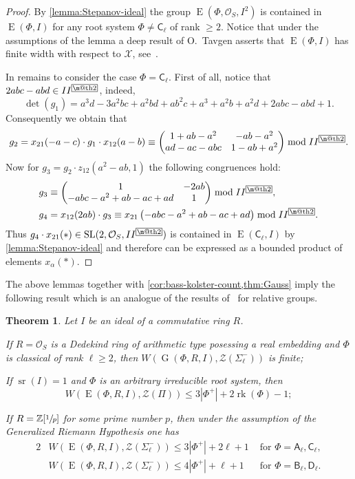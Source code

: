 \documentclass[11pt]{amsart}
\makeatletter
\theoremstyle{plain}
\newtheorem{thm}{Theorem}
\numberwithin{equation}{section}
\numberwithin{lemma}{section}
\theoremstyle{definition}
\theoremstyle{remark}
\DeclareMathOperator{\G}{G}
\DeclareMathOperator{\SL}{SL}
\DeclareMathOperator{\E}{E}
\DeclareMathOperator{\sr}{sr}
\DeclareMathOperator{\rk}{rk}
\newcommand{\rA}{\mathsf{A}}
\newcommand{\rB}{\mathsf{B}}
\newcommand{\rC}{\mathsf{C}}
\newcommand{\rD}{\mathsf{D}}
\newcommand{\indexbox}[1]{\text{\fboxsep=.1em\fbox{\m@th$\displaystyle#1$}}}
\makeatother
\begin{document}
\begin{proof}
By \cref{lemma:Stepanov-ideal} the group $\E\left(\Phi, \mathcal{O}_S, I^2\right)$ is contained in $\E(\Phi, I)$ for any root system $\Phi\neq\rC_\ell$ of rank $\geqslant2$.
Notice that under the assumptions of the lemma a deep result of O.~Tavgen asserts that $\E(\Phi, I)$ has finite width with respect to $\mathcal{X}$, see~\cite[Theorem~3.3]{TavgenThesis}.

In remains to consider the case $\Phi=\rC_\ell$. First of all, notice that $2abc-abd\in II^{\indexbox{2}}$, indeed,
\[ \det(g_1)=a^3d-3a^2bc+a^2bd+ab^2c+a^3+a^2b+a^2d+2abc-abd+1. \]
Consequently we obtain that
\[ g_2=x_{21}(-a-c)\cdot g_1\cdot x_{12}(a-b)\equiv
\begin{pmatrix}
1+ab-a^2 & -ab-a^2 \\ ad-ac-abc & 1-ab+a^2
\end{pmatrix}\bmod II^{\indexbox{2}}. \]
Now for $g_3=g_2\cdot z_{12}\left(a^2-ab, 1\right)$ the following congruences hold:
\begin{align*}
& g_3\equiv\begin{pmatrix} 1 & -2ab \\ -abc-a^2+ab-ac+ad & 1 \end{pmatrix}\bmod II^{\indexbox{2}}, \\
& g_4=x_{12}(2ab)\cdot g_3\equiv x_{21}\left(-abc-a^2+ab-ac+ad\right)\bmod II^{\indexbox{2}}.
\end{align*}
Thus $g_4\cdot x_{21}(*)\in\SL(2, \mathcal{O}_S, II^{\indexbox{2}})$ is contained in $\E(\rC_\ell, I)$ by \cref{lemma:Stepanov-ideal} and therefore
can be expressed as a bounded product of elements $x_\alpha(*)$.
\end{proof}
The above lemmas together with \cref{cor:bass-kolster-count,thm:Gauss} imply the following result
 which is an analogue of the results of~\cite{VseUnitrZ1p, VavSmSuUnitrEng, Tavgen91} for relative groups.
\begin{thm}\label{thm:width} Let $I$ be an ideal of a commutative ring $R$.
\begin{thmlist}
\item If $R=\mathcal{O}_S$ is a Dedekind ring of arithmetic type posessing a real embedding and $\Phi$ is classical of rank $\ell\geqslant2$, then 
$W(\G(\Phi, R, I), \mathcal{Z}(\Sigma_\ell^-))$ is finite;
\item If $\sr(I) = 1$ and $\Phi$ is an arbitrary irreducible root system, then 
\[W(\E(\Phi, R, I), \mathcal{Z}(\Pi))\leqslant 3|\Phi^+|+2\rk(\Phi)-1;\]
\item If $R = \mathbb{Z}[\sfrac{1}{p}]$ for some prime number $p$, then under the assumption of the Generalized Riemann Hypothesis one has
\begin{alignat*}{2}
& W(\E(\Phi, R, I), \mathcal{Z}(\Sigma_\ell^-))\leqslant 3|\Phi^+| + 2\ell + 1 & \text{ for } \Phi=\rA_\ell, \rC_\ell, \\
& W(\E(\Phi, R, I), \mathcal{Z}(\Sigma_\ell^-))\leqslant 4|\Phi^+| + \ell + 1 & \text{ for } \Phi=\rB_\ell, \rD_\ell.
\end{alignat*}
\end{thmlist}
\end{thm}

\printbibliography
\end{document}
